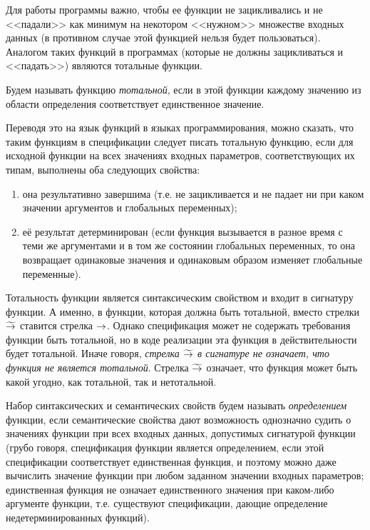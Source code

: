 Для работы программы важно, чтобы ее функции не зацикливались и не <<падали>> как минимум на некотором <<нужном>> множестве входных данных (в противном случае этой функцией нельзя будет пользоваться). Аналогом таких функций в программах (которые не должны зацикливаться и <<падать>>) являются тотальные функции.

Будем называть функцию \emph{тотальной}, если в этой функции каждому значению из области определения соответствует единственное значение.

Переводя это на язык функций в языках программирования, можно сказать, что таким функциям в спецификации следует писать тотальную функцию, если для исходной функции на всех значениях входных параметров, соответствующих их типам, выполнены оба следующих свойства:
\begin{enumerate}
  \item она результативно завершима (т.е. не зацикливается и не падает ни при каком значении аргументов и глобальных переменных);
  \item её результат детерминирован (если функция вызывается в разное время с теми же аргументами и в том же состоянии глобальных переменных, то она возвращает одинаковые значения и одинаковым образом изменяет глобальные переменные).

\end{enumerate}

Тотальность функции является синтаксическим свойством и входит в сигнатуру функции. А именно, в функции, которая должна быть тотальной, вместо стрелки $\widetilde{\rightarrow}$ ставится стрелка $\rightarrow$. Однако спецификация может не содержать требования функции быть тотальной, но в коде реализации эта функция в действительности будет тотальной. Иначе говоря, \textit{стрелка $\widetilde{\rightarrow}$ в сигнатуре не означает, что функция не является тотальной}. Стрелка $\widetilde{\rightarrow}$ означает, что функция может быть какой угодно, как тотальной, так и нетотальной.


Набор синтаксических и семантических свойств будем называть \emph{определением} функции, если семантические свойства дают возможность однозначно судить о значениях функции при всех входных данных, допустимых сигнатурой функции (грубо говоря, спецификация функции является определением, если этой спецификации соответствует единственная функция, и поэтому можно даже вычислить значение функции при любом заданном значении входных параметров; единственная функция не означает единственного значения при каком-либо аргументе функции, т.е. существуют спецификации, дающие определение недетерминированных функций).

